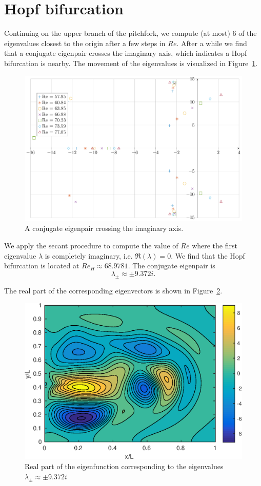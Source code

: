 \section{Hopf bifurcation}

Continuing on the upper branch of the pitchfork, we compute (at most) 6 of the eigenvalues closest to the origin after a few steps in $Re.$ After a while we find that a conjugate eigenpair crosses the imaginary axis, which indicates a Hopf bifurcation is nearby. The movement of the eigenvalues is visualized in Figure~\ref{fig:eigenpair_crossing_imag}.

\begin{figure}[h]
  \caption{A conjugate eigenpair crossing the imaginary axis.}
  \label{fig:eigenpair_crossing_imag}
  \centerline{\includegraphics[width=\textwidth]{images/eigenwaarden_hopf.pdf}}
\end{figure}

We apply the secant procedure to compute the value of $Re$ where the first eigenvalue $\lambda$ is completely imaginary, i.e. $\Re(\lambda) = 0.$ We find that the Hopf bifurcation is located at $Re_H \approx 68.9781.$ The conjugate eigenpair is $$\lambda_\pm \approx \pm 9.372i.$$

The real part of the corresponding eigenvectors is shown in Figure~\ref{fig:eigenfunction}.

\begin{figure}
  \caption{Real part of the eigenfunction corresponding to the eigenvalues $\lambda_\pm \approx \pm 9.372i$}
  \label{fig:eigenfunction}
  \centerline{\includegraphics[width=\textwidth]{images/eigenvector_bij_hopf_reele_deel.eps}}
\end{figure}
